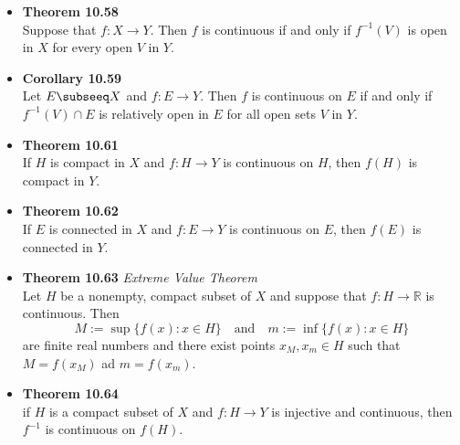 \documentclass[11pt,a4paper]{article}
\begin{document}
\begin{itemize}
    \item \textbf{Theorem 10.58} \\
        Suppose that $f : X \to Y$.
        Then $f$ is continuous if and only if $f^{-1} (V)$ is open in $X$ for every open
        $V$ in $Y$.

    \item \textbf{Corollary 10.59} \\
        Let $E \subseeq X$ and $f : E \to Y$.
        Then $f$ is continuous on $E$ if and only if $f^{-1}(V) \cap E$ is relatively
        open in $E$ for all open sets $V$ in $Y$.

    \item \textbf{Theorem 10.61} \\
        If $H$ is compact in $X$ and $f : H \to Y$ is continuous on $H$,
        then $f(H)$ is compact in $Y$.

    \item \textbf{Theorem 10.62} \\
        If $E$ is connected in $X$ and $f : E \to Y$ is continuous on $E$,
        then $f(E)$ is connected in $Y$.

    \item \textbf{Theorem 10.63} \emph{Extreme Value Theorem} \\
        Let $H$ be a nonempty, compact subset of $X$ and suppose that $f : H \to \mathbb{R}$
        is continuous.
        Then
        \[
            M := \sup \{ f(x) : x \in H \} \quad \text{and} \quad
            m := \inf \{ f(x) : x \in H \}
        \]
        are finite real numbers and there exist points $x_M, x_m \in H$ such that
        $M = f(x_M)$ ad $m = f(x_m)$.

    \item \textbf{Theorem 10.64} \\
        if $H$ is a compact subset of $X$ and $f : H \to Y$ is injective and continuous,
        then $f^{-1}$ is continuous on $f(H)$.

\end{itemize}
\end{document}
